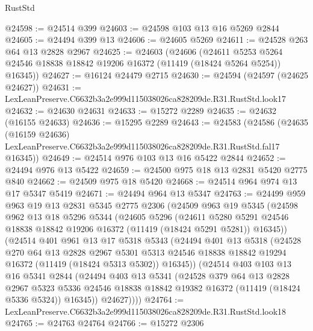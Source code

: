 \begin{lexlean}{RustStd}
\begin{coremodule}
@24598 := @24514 @399
@24603 := @24598 @103 @13 @16 @5269 @2844
@24605 := @24494 @399 @13
@24606 := @24605 @5269
@24611 := @24528 @263 @64 @13 @2828 @2967
@24625 := @24603
    (@24606
      (@24611 @5253 @5264 @24546 @18838 @18842 @19206 @16372 (@11419 (@18424 @5264 @5254)) @16345))
@24627 := @16124 @24479 @2715
@24630 := @24594 (@24597 (@24625 @24627))
@24631 := LexLeanPreserve.C6632b3a2e999d115038026ca828209de.R31.RustStd.look17
@24632 := @24630 @24631
@24633 := @15272 @2289
@24635 := @24632 (@16155 @24633)
@24636 := @15295 @2289
@24643 := @24583
    (@24586
      (@24635
        (@16159 @24636)
        LexLeanPreserve.C6632b3a2e999d115038026ca828209de.R31.RustStd.fal17
        @16345))
@24649 := @24514 @976 @103 @13 @16 @5422 @2844
@24652 := @24494 @976 @13 @5422
@24659 := @24500 @975 @18 @13 @2831 @5420 @2775 @840
@24662 := @24509 @975 @18 @5420
@24668 := @24514 @964 @974 @13 @17 @5347 @5419
@24671 := @24494 @964 @13 @5347
@24763 := @24499
    @959
    @963
    @19
    @13
    @2831
    @5345
    @2775
    @2306
    (@24509
      @963
      @19
      @5345
      (@24598
        @962
        @13
        @18
        @5296
        @5344
        (@24605
          @5296
          (@24611
            @5280
            @5291
            @24546
            @18838
            @18842
            @19206
            @16372
            (@11419 (@18424 @5291 @5281))
            @16345))
        (@24514
          @401
          @961
          @13
          @17
          @5318
          @5343
          (@24494
            @401
            @13
            @5318
            (@24528
              @270
              @64
              @13
              @2828
              @2967
              @5301
              @5313
              @24546
              @18838
              @18842
              @19294
              @16372
              (@11419 (@18424 @5313 @5302))
              @16345))
          (@24514
            @403
            @103
            @13
            @16
            @5341
            @2844
            (@24494
              @403
              @13
              @5341
              (@24528
                @379
                @64
                @13
                @2828
                @2967
                @5323
                @5336
                @24546
                @18838
                @18842
                @19382
                @16372
                (@11419 (@18424 @5336 @5324))
                @16345))
            @24627))))
@24764 := LexLeanPreserve.C6632b3a2e999d115038026ca828209de.R31.RustStd.look18
@24765 := @24763 @24764
@24766 := @15272 @2306

\end{coremodule}
\end{lexlean}

